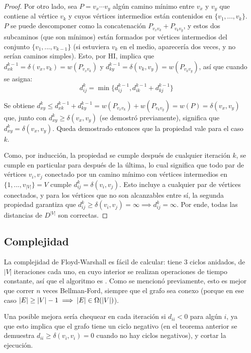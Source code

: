 \begin{proof}
    Por otro lado, sea $P = v_x \cdots v_y$ algún camino mínimo entre $v_x$ y $v_y$ que contiene al vértice $v_k$ y cuyos vértices intermedios están contenidos en $\{v_1, ..., v_k\}$. $P$ se puede descomponer como la concatenación $P_{v_x v_k} + P_{v_k v_y}$, y estos dos subcaminos (que son mínimos) están formados por vértices intermedios del conjunto $\{v_1, ..., v_{k - 1}\}$ (si estuviera $v_k$ en el medio, aparecería dos veces, y no serían caminos simples). Esto, por HI, implica que $d^{k - 1}_{xk} = \delta(v_x, v_k) = w(P_{v_x v_k})$ y $d^{k - 1}_{ky} = \delta(v_k, v_y) = w(P_{v_k v_y})$, así que cuando se asigna:
    $$d^k_{ij} = \min{\{d^{k - 1}_{ij}, d^{k - 1}_{ik} + d^{k - 1}_{kj}\}}$$

    Se obtiene $d^k_{xy} \leq d^{k - 1}_{xk} + d^{k - 1}_{ky} = w(P_{v_x v_k}) + w(P_{v_k v_y}) = w(P) = \delta(v_x, v_y)$ que, junto con $d^k_{xy} \geq \delta(v_x, v_y)$ (se demostró previamente), significa que $d^k_{xy} = \delta(v_x, v_y)$. Queda demostrado entonces que la propiedad vale para el caso $k$.

    Como, por inducción, la propiedad se cumple después de cualquier iteración $k$, se cumple en particular para después de la última, lo cual significa que todo par de vértices $v_i, v_j$ conectado por un camino mínimo con vértices intermedios en $\{1, ..., v_{|V|}\} = V$ cumple $d^k_{ij} = \delta(v_i, v_j)$. Esto incluye a cualquier par de vértices conectados, y para los vértices que no son alcanzables entre sí, la segunda propiedad garantiza que $d^k_{ij} \geq \delta(v_i, v_j) = \infty \implies d^k_{ij} = \infty$. Por ende, todas las distancias de $D^{|V|}$ son correctas.

\end{proof}

\subsection{Complejidad}

La complejidad de Floyd-Warshall es fácil de calcular: tiene 3 ciclos anidados, de $|V|$ iteraciones cada uno, en cuyo interior se realizan operaciones de tiempo constante, así que el algoritmo es . Como se mencionó previamente, esto es mejor que correr $n$ veces Bellman-Ford, siempre que el grafo sea conexo (porque en ese caso $|E| \geq |V| - 1 \implies |E| \in \Omega(|V|)$).

Una posible mejora sería chequear en cada iteración si $d_{ii} < 0$ para algún $i$, ya que esto implica que el grafo tiene un ciclo negativo (en el teorema anterior se demuestra $d_{ii} \geq \delta(v_i, v_i) = 0$ cuando no hay ciclos negativos), y cortar la ejecución.

